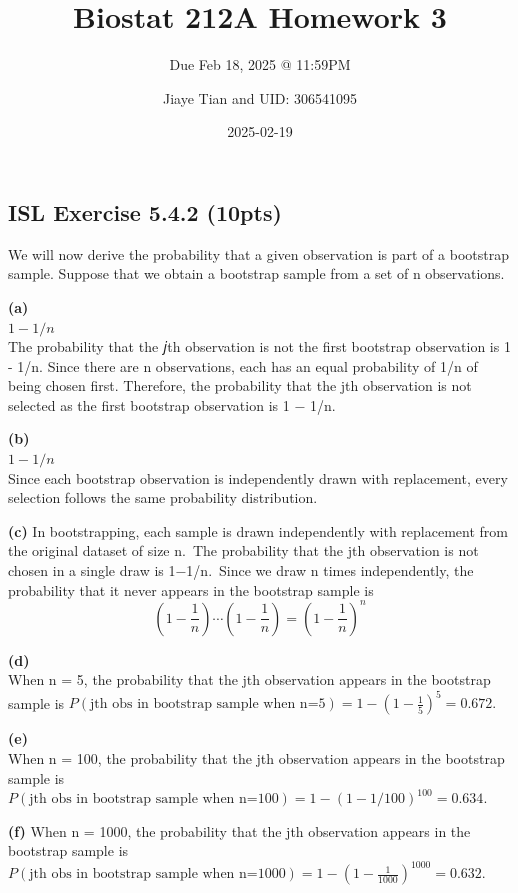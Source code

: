 \documentclass[
  letterpaper,
  DIV=11,
  numbers=noendperiod]{scrartcl}
\title{Biostat 212A Homework 3}
\subtitle{Due Feb 18, 2025 @ 11:59PM}
\author{Jiaye Tian and UID: 306541095}
\date{2025-02-19}
\renewcommand*\contentsname{Table of contents}
\newcommand\contentsname{Table of contents}
\begin{document}
\maketitle

\renewcommand*\contentsname{Table of contents}
{
\hypersetup{linkcolor=}
\setcounter{tocdepth}{4}
\tableofcontents
}

\subsection{ISL Exercise 5.4.2 (10pts)}\label{isl-exercise-5.4.2-10pts}

We will now derive the probability that a given observation is part of a
bootstrap sample. Suppose that we obtain a bootstrap sample from a set
of n observations.

\textbf{(a)}\\
\(1 - 1/n\)\\
The probability that the 𝑗th observation is not the first bootstrap
observation is 1 - 1/n. Since there are n observations, each has an
equal probability of 1/n of being chosen first. Therefore, the
probability that the jth observation is not selected as the first
bootstrap observation is 1 − 1/n.

\textbf{(b)}\\
\(1 - 1/n\)\\
Since each bootstrap observation is independently drawn with
replacement, every selection follows the same probability distribution.

\textbf{(c)} In bootstrapping, each sample is drawn independently with
replacement from the original dataset of size n.~The probability that
the jth observation is not chosen in a single draw is 1−1/n.~Since we
draw n times independently, the probability that it never appears in the
bootstrap sample is \[
(1 - \frac{1}{n}) \cdots (1 - \frac{1}{n}) = (1 - \frac{1}{n})^n
\]

\textbf{(d)}\\
When n = 5, the probability that the jth observation appears in the
bootstrap sample is
\(P(\text{jth obs in bootstrap sample when n=5}) = 1 - (1 - \frac{1}{5})^5 = 0.672.\)

\textbf{(e)}\\
When n = 100, the probability that the jth observation appears in the
bootstrap sample is
\(P(\text{jth obs in bootstrap sample when n=100}) = 1 - (1 - 1/100)^{100} = 0.634.\)

\textbf{(f)} When n = 1000, the probability that the jth observation
appears in the bootstrap sample is
\(P(\text{jth obs in bootstrap sample when n=1000}) = 1 - (1 - \frac{1}{1000})^{1000} = 0.632.\)
\end{document}
